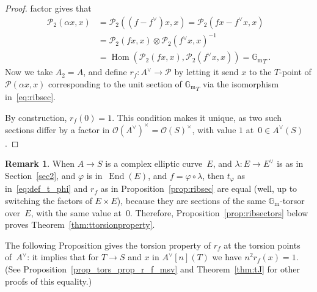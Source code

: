 \documentclass[JEP,XML,SOM,Unicode,NoFloatCountersInSection]{cedram}
\let\mathcal\mathscr
\let\oldvee\vee
\renewcommand{\vee}{{\scriptscriptstyle\oldvee}}
\theoremstyle{plain}
\theoremstyle{definition}
\newtheorem{Remark}[subsection]{Remark}
\numberwithin{equation}{subsection}
\let\phi\varphi
\renewcommand{\G}{\mathbb G}
\newcommand{\calO}{\mathcal{O}}
\newcommand{\calP}{\mathcal{P}}
\newcommand{\Gm}{\G_{\mathrm{m}}}
\DeclareMathOperator{\End}{End}
\DeclareMathOperator{\Hom}{Hom}
\begin{document}
\begin{proof}
factor gives that
\begin{equation}\label{eq:ribsec}
\begin{split}
\calP_2(\alpha x,x) &= \calP_2((f-f^\vee)x,x) = \calP_2(fx - f^\vee x,x) \\
&= \calP_2(fx,x)\otimes\calP_2(f^\vee x,x)^{-1}\\
&
=\Hom(\calP_2(fx,x),\calP_2(f^\vee x,x)) = {\Gm}_T\, .
\end{split}
\end{equation}
Now we take $A_2=A$, and define $r_f\colon A^\vee \to \calP$ by
letting it send $x$ to the $T$-point of $\calP(\alpha x,x)$
corresponding to the unit section of ${\Gm}_T$ via the isomorphism
in~\eqref{eq:ribsec}.

By construction, $r_f(0)=1$. This condition makes it unique, as two
such sections differ by a factor in $\calO(A^\vee)^\times=\calO(S)^\times$,
with value $1$ at~$0\in A^\vee(S)$.
\end{proof}

\begin{Remark}
When $A \rightarrow S$ is a complex elliptic curve~$E$, and
$\lambda\colon E\to E^\vee$ is as in Section~\ref{sec2}, and $\phi$ is
in~$\End(E)$, and $f=\phi\circ\lambda$, then $t_\phi$ as
in~\eqref{eq:def_t_phi} and $r_f$ as in Proposition~\ref{prop:ribsec} are
equal (well, up to switching the factors of $E\times E$), because they
are sections of the same $\Gm$-torsor over~$E$, with the same value
at~$0$. Therefore, Proposition~\ref{prop:ribsectors} below proves
Theorem~\ref{thm:ttorsionproperty}.
\end{Remark}

The following Proposition gives the torsion property of $r_f$ at the
torsion points of~$A^\vee$: it implies that for $T\to S$ and $x$ in
$A^\vee[n](T)$ we have $n^2r_f(x)=1$. (See
Proposition~\ref{prop_tors_prop_r_f_msv} and Theorem~\ref{thm:tJ} for
other proofs of this equality.)
\end{document}
